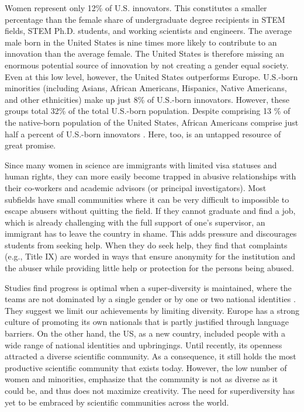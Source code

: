 \documentclass[utf8]{frontiersSCNS} %
\begin{document}
Women represent only 12\% of U.S. innovators. This constitutes a smaller percentage than the female share of undergraduate degree recipients in STEM fields, STEM Ph.D. students, and working scientists and engineers. The average male born in the United States is nine times more likely to contribute to an innovation than the average female. The United States is therefore missing an enormous potential source of innovation by not creating a gender equal society. Even at this low level, however, the United States outperforms Europe. U.S.-born minorities (including Asians, African Americans, Hispanics, Native Americans, and other ethnicities) make up just 8\% of U.S.-born innovators. However, these groups total 32\% of the total U.S.-born population. Despite comprising 13 \% of the native-born population of the United States, African Americans comprise just half a percent of U.S.-born innovators \citep{nager2016demographics}. Here, too, is an untapped resource of great promise. 

Since many women in science are immigrants with limited visa statuses and human rights, they can more easily become trapped in abusive relationships with their co-workers and academic advisors (or principal investigators). Most subfields have small communities where it can be very difficult to impossible to escape abusers without quitting the field. If they cannot graduate and find a job, which is already challenging with the full support of one's supervisor, an immigrant has to leave the country in shame. This adds pressure and discourages students from seeking help. When they do seek help, they find that complaints (e.g., Title IX) are worded in ways that ensure anonymity for the institution and the abuser while providing little help or protection for the persons being abused.

 Studies find progress is optimal when a super-diversity is maintained, where the teams are not dominated by a single gender or by one or two national identities \citep{page2007making}. They suggest we limit our achievements by limiting diversity. Europe has a strong culture of promoting its own nationals that is partly justified through language barriers. On the other hand, the US, as a new country, included people with a wide range of national identities and  upbringings. Until recently, its openness attracted a diverse scientific community. As a consequence, it still holds the most productive scientific community that exists today. However, the low number of women and minorities, emphasize that the community is not as diverse as it could be, and thus does not maximize creativity. The need for superdiversity has yet to be embraced by scientific communities across the world. %
\end{document}
